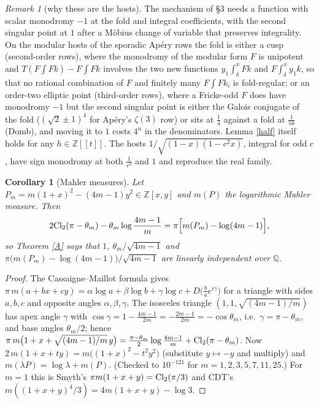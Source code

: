 \documentclass[11pt]{amsart}
\newtheorem{corollary}[theorem]{Corollary}
\theoremstyle{remark}
\newtheorem{remark}[theorem]{Remark}
\newcommand{\Q}{\mathbb Q}\newcommand{\Z}{\mathbb Z}\newcommand{\R}{\mathbb R}\newcommand{\C}{\mathbb C}
\begin{document}
\begin{remark}[why these are the hosts]
The mechanism of \S3 needs a function with scalar monodromy $-1$ at the fold and integral coefficients, with the second singular point at $1$ after a Möbius change of variable that preserves integrality. On the modular hosts of the sporadic Apéry rows the fold is either a cusp (second-order rows), where the monodromy of the modular form $F$ is unipotent and $T(F\!\int\!Fk)-F\!\int\!Fk$ involves the two new functions $y_1\!\int_\delta^xFk$ and $F\!\int_\delta^xy_1k$, so that no rational combination of $F$ and finitely many $F\!\int\!Fk_i$ is fold-regular; or an order-two elliptic point (third-order rows), where a Fricke-odd $F$ does have monodromy $-1$ but the second singular point is either the Galois conjugate of the fold ($(\sqrt2\pm1)^4$ for Apéry's $\zeta(3)$ row) or sits at $\frac14$ against a fold at $\frac1{16}$ (Domb), and moving it to $1$ costs $4^n$ in the denominators. Lemma \ref{half} itself holds for any $h\in\Z[[t]]$. The hosts $1/\sqrt{(1-x)(1-c^2x)}$, integral for odd $c$, have sign monodromy at both $\frac1{c^2}$ and $1$ and reproduce the real family.
\end{remark}

\begin{corollary}[Mahler measures]\label{mahler}
Let $P_m=m(1+x)^2-(4m-1)y^2\in\Z[x,y]$ and $m(P)$ the logarithmic Mahler measure. Then
\[
2\mathrm{Cl}_2(\pi-\theta_m)-\theta_m\log\frac{4m-1}m=\pi\Bigl[m(P_m)-\log(4m-1)\Bigr],
\]
so Theorem \ref{A} says that $1$, $\theta_m/\sqrt{4m-1}$ and $\pi\bigl(m(P_m)-\log(4m-1)\bigr)/\sqrt{4m-1}$ are linearly independent over $\Q$.
\end{corollary}

\begin{proof}
The Cassaigne--Maillot formula gives $\pi\,m(a+bx+cy)=\alpha\log a+\beta\log b+\gamma\log c+D\bigl(\frac bae^{i\gamma}\bigr)$ for a triangle with sides $a,b,c$ and opposite angles $\alpha,\beta,\gamma$. The isosceles triangle $(1,1,\sqrt{(4m-1)/m})$ has apex angle $\gamma$ with $\cos\gamma=1-\frac{4m-1}{2m}=-\frac{2m-1}{2m}=-\cos\theta_m$, i.e.\ $\gamma=\pi-\theta_m$, and base angles $\theta_m/2$; hence $\pi\,m\bigl(1+x+\sqrt{(4m-1)/m}\,y\bigr)=\frac{\pi-\theta_m}2\log\frac{4m-1}m+\mathrm{Cl}_2(\pi-\theta_m)$. Now $2\,m(1+x+ty)=m\bigl((1+x)^2-t^2y^2\bigr)$ (substitute $y\mapsto-y$ and multiply) and $m(\lambda P)=\log\lambda+m(P)$. (Checked to $10^{-121}$ for $m=1,2,3,5,7,11,25$.) For $m=1$ this is Smyth's $\pi m(1+x+y)=\mathrm{Cl}_2(\pi/3)$ and CDT's $m((1+x+y)^4/3)=4m(1+x+y)-\log3$.
\end{proof}
\end{document}
